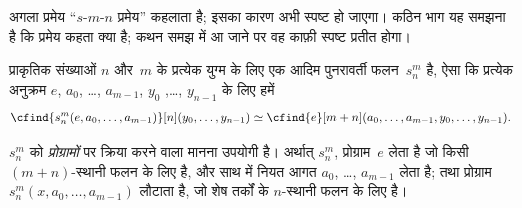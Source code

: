 \documentclass[../../../include/open-logic-section]{subfiles}
\begin{document}

\begin{explain}
अगला प्रमेय ``$s$-$m$-$n$ प्रमेय'' कहलाता है; इसका कारण अभी स्पष्ट हो
जाएगा। कठिन भाग यह समझना है कि प्रमेय कहता क्या है; कथन समझ में आ जाने
पर वह काफ़ी स्पष्ट प्रतीत होगा।
\end{explain}

\begin{thm}
  प्राकृतिक संख्याओं $n$ और~$m$ के प्रत्येक युग्म के लिए एक आदिम
  पुनरावर्ती फलन~$s^m_n$ है, ऐसा कि प्रत्येक अनुक्रम
  $e$, $a_0$, \dots, $a_{m-1}$, $y_0$ ,\dots, $y_{n-1}$ के लिए हमें
  \[
  \cfind{s^m_n(e, a_0, \dots, a_{m-1})}[n](y_0, \dots, y_{n-1}) \simeq
  \cfind{e}[m+n](a_0, \dots, a_{m-1}, y_0, \dots, y_{n-1}).
\]
\end{thm}

\begin{explain}
$s^m_n$ को \emph{प्रोग्रामों} पर क्रिया करने वाला मानना उपयोगी है।
अर्थात् $s^m_n$, प्रोग्राम~$e$ लेता है जो किसी $(m+n)$-स्थानी फलन के लिए
है, और साथ में नियत आगत $a_0$, \dots, $a_{m-1}$ लेता है; तथा प्रोग्राम
$s^m_n(x, a_0, \dots, a_{m-1})$ लौटाता है, जो शेष तर्कों के $n$-स्थानी
फलन के लिए है।
\end{explain}
\end{document}
